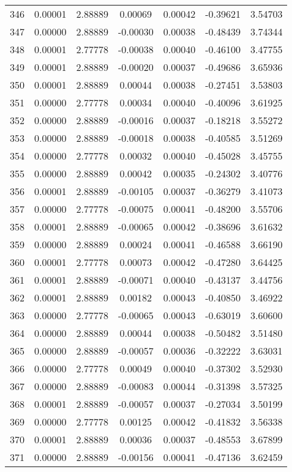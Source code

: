 \begin{longtable}{c c c c c c c}
346 &  0.00001 &      2.88889 &  0.00069 &   0.00042 &  -0.39621 &   3.54703 \\
347 &  0.00000 &      2.88889 & -0.00030 &   0.00038 &  -0.48439 &   3.74344 \\
348 &  0.00001 &      2.77778 & -0.00038 &   0.00040 &  -0.46100 &   3.47755 \\
349 &  0.00001 &      2.88889 & -0.00020 &   0.00037 &  -0.49686 &   3.65936 \\
350 &  0.00001 &      2.88889 &  0.00044 &   0.00038 &  -0.27451 &   3.53803 \\
351 &  0.00000 &      2.77778 &  0.00034 &   0.00040 &  -0.40096 &   3.61925 \\
352 &  0.00000 &      2.88889 & -0.00016 &   0.00037 &  -0.18218 &   3.55272 \\
353 &  0.00000 &      2.88889 & -0.00018 &   0.00038 &  -0.40585 &   3.51269 \\
354 &  0.00000 &      2.77778 &  0.00032 &   0.00040 &  -0.45028 &   3.45755 \\
355 &  0.00000 &      2.88889 &  0.00042 &   0.00035 &  -0.24302 &   3.40776 \\
356 &  0.00001 &      2.88889 & -0.00105 &   0.00037 &  -0.36279 &   3.41073 \\
357 &  0.00000 &      2.77778 & -0.00075 &   0.00041 &  -0.48200 &   3.55706 \\
358 &  0.00001 &      2.88889 & -0.00065 &   0.00042 &  -0.38696 &   3.61632 \\
359 &  0.00000 &      2.88889 &  0.00024 &   0.00041 &  -0.46588 &   3.66190 \\
360 &  0.00001 &      2.77778 &  0.00073 &   0.00042 &  -0.47280 &   3.64425 \\
361 &  0.00001 &      2.88889 & -0.00071 &   0.00040 &  -0.43137 &   3.44756 \\
362 &  0.00001 &      2.88889 &  0.00182 &   0.00043 &  -0.40850 &   3.46922 \\
363 &  0.00000 &      2.77778 & -0.00065 &   0.00043 &  -0.63019 &   3.60600 \\
364 &  0.00000 &      2.88889 &  0.00044 &   0.00038 &  -0.50482 &   3.51480 \\
365 &  0.00000 &      2.88889 & -0.00057 &   0.00036 &  -0.32222 &   3.63031 \\
366 &  0.00000 &      2.77778 &  0.00049 &   0.00040 &  -0.37302 &   3.52930 \\
367 &  0.00000 &      2.88889 & -0.00083 &   0.00044 &  -0.31398 &   3.57325 \\
368 &  0.00001 &      2.88889 & -0.00057 &   0.00037 &  -0.27034 &   3.50199 \\
369 &  0.00000 &      2.77778 &  0.00125 &   0.00042 &  -0.41832 &   3.56338 \\
370 &  0.00001 &      2.88889 &  0.00036 &   0.00037 &  -0.48553 &   3.67899 \\
371 &  0.00000 &      2.88889 & -0.00156 &   0.00041 &  -0.47136 &   3.62459 \\
\end{longtable}
